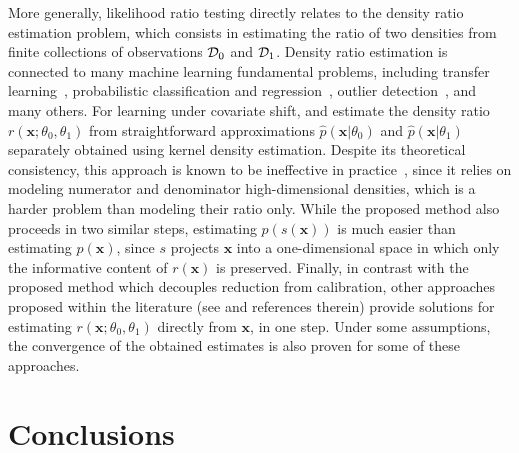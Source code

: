 \documentclass[12pt]{article}
\numberwithin{equation}{section}
\theoremstyle{plain}
\begin{document}
More generally, likelihood ratio testing directly relates to the density ratio
estimation problem, which consists in estimating the ratio of two
densities from finite collections of observations ${\cal D}_0$ and
${\cal D}_1$. Density ratio estimation is connected to many machine learning
fundamental problems, including transfer learning~\citep{sugiyama2012machine},
probabilistic classification and regression~\citep{vapnik1998statistical},
outlier detection~\citep{hido2011statistical}, and many others. For learning
under covariate shift, \cite{shimodaira2000improving} and \cite{sugiyama2005input} estimate
the density ratio $r(\mathbf{x};\theta_0,\theta_1)$ from straightforward
approximations $\hat{p}(\mathbf{x}|\theta_0)$ and $\hat{p}(\mathbf{x}|\theta_1)$
separately obtained using kernel density estimation. Despite its theoretical
consistency, this approach is known to be ineffective in
practice~\citep{sugiyama2007covariate,bickel2009discriminative}, since
it relies on modeling numerator and denominator high-dimensional densities,
which is a harder problem than modeling their ratio only.
While the proposed method also proceeds in two similar steps, estimating
$p(s(\mathbf{x}))$ is much easier than estimating $p(\mathbf{x})$,
since $s$ projects $\mathbf{x}$ into a one-dimensional space in which only
the informative content of $r(\mathbf{x})$ is preserved.
Finally, in contrast with the
proposed method which decouples reduction from calibration, other
approaches proposed within the literature (see
\cite{sugiyama2012density,gretton2009covariate,nguyen2010estimating,vapnik2013constructive}
and references therein) provide solutions for estimating
$r(\mathbf{x};\theta_0,\theta_1)$ directly from $\mathbf{x}$, in one step. Under some
assumptions, the convergence of the obtained estimates is also proven for some
of these approaches.



\section{Conclusions}
\label{sec:conclusions}
\end{document}
